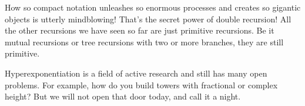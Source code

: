 \documentclass{article}
\begin{document}
How so compact notation unleashes so enormous processes 
and creates so gigantic objects is utterly mindblowing! That's the secret power 
of double recursion! All the other recursions we have seen so far are just 
primitive recursions. Be it mutual recursions or tree recursions with two 
or more branches, they are still primitive. 

Hyperexponentiation is a field of active research and still has many open 
problems. For example, how do you build towers with fractional or complex 
height? But we will not open that door today, and call it a night.
\end{document}
